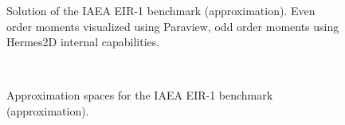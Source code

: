 \begin{figure}[!ht]
%
{}
\hspace{1em}
\caption[Solution of the IAEA EIR-1 benchmark ($\text{SP}_5$)]{Solution of the IAEA EIR-1 benchmark
   (\SPN[5] approximation). Even order moments visualized using Paraview, odd order moments using Hermes2D internal
   capabilities.}
  \label{fig:41}
\end{figure}

\begin{figure}[!hb]
\centering
{}
\hspace{1em}
\\[.5em]
\caption[Approximation spaces for the IAEA EIR-1 benchmark ($\text{SP}_5$)]{Approximation spaces for the IAEA EIR-1
benchmark (\SPN[5] approximation).}
  \label{fig:43}
\end{figure}

